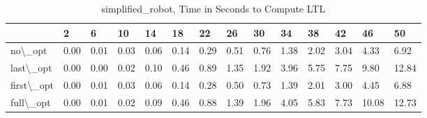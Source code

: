 \begin{table}
\centering
\caption{simplified\_robot, Time in Seconds to Compute LTL}
\label{simplified_robot_LTL_time}
\begin{tabular}{llllllllllllll}
\toprule
{} &     2 &     6 &    10 &    14 &    18 &    22 &    26 &    30 &    34 &    38 &    42 &     46 &     50 \\
\midrule
no\textbackslash \_opt    &  0.00 &  0.01 &  0.03 &  0.06 &  0.14 &  0.29 &  0.51 &  0.76 &  1.38 &  2.02 &  3.04 &   4.33 &   6.92 \\
last\textbackslash \_opt  &  0.00 &  0.00 &  0.02 &  0.10 &  0.46 &  0.89 &  1.35 &  1.92 &  3.96 &  5.75 &  7.75 &   9.80 &  12.84 \\
first\textbackslash \_opt &  0.00 &  0.01 &  0.03 &  0.06 &  0.14 &  0.28 &  0.50 &  0.73 &  1.39 &  2.01 &  3.00 &   4.45 &   6.88 \\
full\textbackslash \_opt  &  0.00 &  0.01 &  0.02 &  0.09 &  0.46 &  0.88 &  1.39 &  1.96 &  4.05 &  5.83 &  7.73 &  10.08 &  12.73 \\
\bottomrule
\end{tabular}
\end{table}
